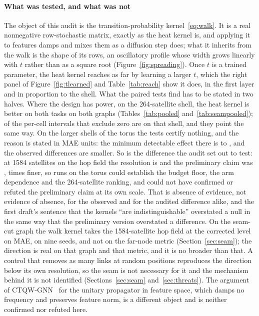 \documentclass[preprint,11pt,3p]{elsarticle}
\begin{document}
\paragraph{What was tested, and what was not}
The object of this audit is the transition-probability kernel~\eqref{eq:walk}. It is a real
nonnegative row-stochastic matrix, exactly as the heat kernel is, and applying it to features
damps and mixes them as a diffusion step does; what it inherits from the walk is the shape of its
rows, an oscillatory profile whose width grows linearly with $t$ rather than as a square root
(Figure~\ref{fig:spreading}). Once $t$ is a trained parameter, the heat kernel reaches as far by
learning a larger $t$, which the right panel of Figure~\ref{fig:tlearned} and
Table~\ref{tab:reach} show it does, in the first layer and in proportion to the shell. What the
paired tests find has to be stated in two halves. Where the design has power, on the
264-satellite shell, the heat kernel is better on both tasks on both graphs
(Tables~\ref{tab:pooled} and~\ref{tab:seampooled}); \numCIExclZeroSmall{} of the
\numCIExclZero{} per-cell intervals that exclude zero are on that shell, and they point the same
way. On the larger shells of the torus the tests certify nothing, and the reason is stated in
MAE units: the minimum detectable effect there is \numPooledMdeLargeMin{} to
\numPooledMdeMax{}, and the observed differences are smaller. So is the difference the audit set
out to test: at 1584 satellites on the hop field the resolution is \numPooledHopsShellOneMde{}
and the preliminary claim was \numPrelimDiff{}, \numMdeRatioHopsShellOne{} times finer, so
\numTotalRuns{} runs on the torus could establish the budget floor, the arm dependence and the
264-satellite ranking, and could not have confirmed or refuted the preliminary claim at its own
scale. That is absence of evidence, not evidence of absence, for the observed and for the
audited difference alike, and the first draft's sentence that the kernels ``are
indistinguishable'' overstated a null in the same way that the preliminary version overstated a
difference. On the seam-cut graph the walk kernel takes the 1584-satellite hop field at the
corrected level on MAE, on nine seeds, and not on the far-node metric
(Section~\ref{sec:seam}); the direction is real on that graph and that metric, and it is no
broader than that. A control that removes as many links at random positions reproduces the
direction below its own resolution, so the seam is not necessary for it and the mechanism behind
it is not identified (Sections~\ref{sec:seam} and~\ref{sec:threats}). The
argument of CTQW-GNN~\cite{ctqwgnn} for the unitary propagator in feature space, which damps no
frequency and preserves feature norm, is a different object and is neither confirmed nor refuted
here.
\end{document}
